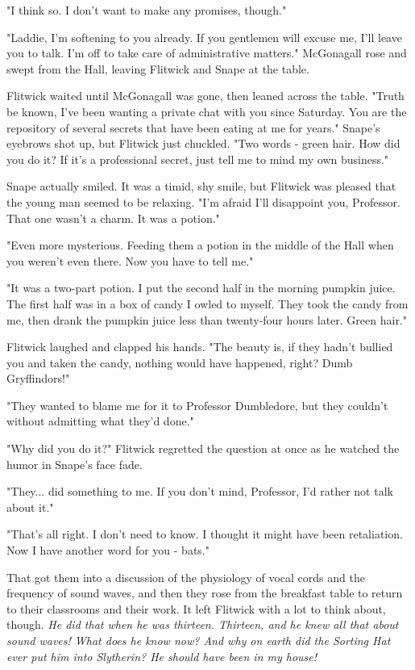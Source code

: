 "I think so. I don't want to make any promises, though."

"Laddie, I'm softening to you already. If you gentlemen will excuse me, I'll leave you to talk. I'm off to take care of administrative matters." McGonagall rose and swept from the Hall, leaving Flitwick and Snape at the table.

Flitwick waited until McGonagall was gone, then leaned across the table. "Truth be known, I've been wanting a private chat with you since Saturday. You are the repository of several secrets that have been eating at me for years." Snape's eyebrows shot up, but Flitwick just chuckled. "Two words - green hair. How did you do it? If it's a professional secret, just tell me to mind my own business."

Snape actually smiled. It was a timid, shy smile, but Flitwick was pleased that the young man seemed to be relaxing. "I'm afraid I'll disappoint you, Professor. That one wasn't a charm. It was a potion."

"Even more mysterious. Feeding them a potion in the middle of the Hall when you weren't even there. Now you have to tell me."

"It was a two-part potion. I put the second half in the morning pumpkin juice. The first half was in a box of candy I owled to myself. They took the candy from me, then drank the pumpkin juice less than twenty-four hours later. Green hair."

Flitwick laughed and clapped his hands. "The beauty is, if they hadn't bullied you and taken the candy, nothing would have happened, right? Dumb Gryffindors!"

"They wanted to blame me for it to Professor Dumbledore, but they couldn't without admitting what they'd done."

"Why did you do it?" Flitwick regretted the question at once as he watched the humor in Snape's face fade.

"They... did something to me. If you don't mind, Professor, I'd rather not talk about it."

"That's all right. I don't need to know. I thought it might have been retaliation. Now I have another word for you - bats."

That got them into a discussion of the physiology of vocal cords and the frequency of sound waves, and then they rose from the breakfast table to return to their classrooms and their work. It left Flitwick with a lot to think about, though. \emph{He did that when he was thirteen. Thirteen, and he knew all that about sound waves! What does he know now? And why on earth did the Sorting Hat ever put him into Slytherin? He should have been in my house!}

